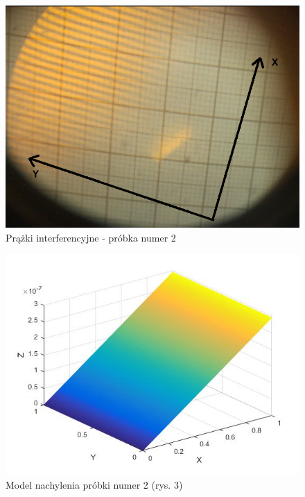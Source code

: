 \documentclass[12pt, a4paper, oneside]{article}
\begin{document}
\begin{figure}[t]
\centering
\caption{Prążki interferencyjne - próbka numer 2}
\includegraphics[scale=.55]{pics/f2_1.png}
\end{figure}
\begin{figure}[b]
\centering
\caption{Model nachylenia próbki numer 2 (rys. 3)}
\includegraphics[scale=0.55]{pics/w1.jpg}
\end{figure}
\end{document}
